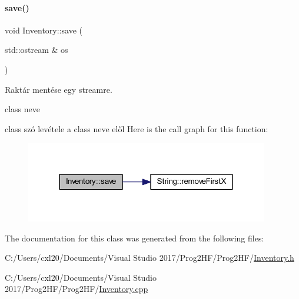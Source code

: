 \paragraph{\texorpdfstring{save()}{save()}}
{\footnotesize\ttfamily void Inventory\+::save (\begin{DoxyParamCaption}\item[{std\+::ostream \&}]{os }\end{DoxyParamCaption})}



Raktár mentése egy streamre. 

class neve

class szó levétele a class neve elől Here is the call graph for this function\+:
\nopagebreak
\begin{figure}[H]
\begin{center}
\leavevmode
\includegraphics[width=300pt]{class_inventory_a243a3e96705999b3cf556e9626a96525_cgraph}
\end{center}
\end{figure}


The documentation for this class was generated from the following files\+:\begin{DoxyCompactItemize}
\item 
C\+:/\+Users/cxl20/\+Documents/\+Visual Studio 2017/\+Prog2\+H\+F/\+Prog2\+H\+F/\mbox{\hyperlink{_inventory_8h}{Inventory.\+h}}\item 
C\+:/\+Users/cxl20/\+Documents/\+Visual Studio 2017/\+Prog2\+H\+F/\+Prog2\+H\+F/\mbox{\hyperlink{_inventory_8cpp}{Inventory.\+cpp}}\end{DoxyCompactItemize}
